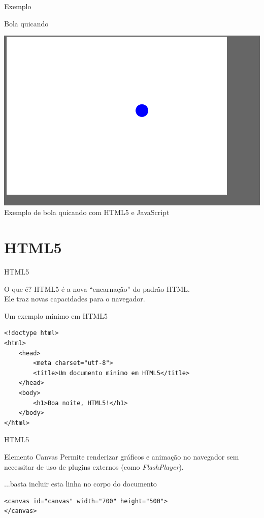 \documentclass[xcolor=dvipsnames,table]{beamer}
\begin{document}
	\begin{frame}{Exemplo}
		\begin{block}{Bola quicando}
			\begin{center}
	    		\includegraphics[height=.7\textheight]{images/bola-quicando.png}
	    		\\Exemplo de bola quicando com HTML5 e JavaScript
	  		\end{center}
		\end{block}
	\end{frame}
	
\section{HTML5}
\begin{frame}[fragile]{HTML5}
	\begin{block}{O que é?}
			HTML5 é a nova ``encarnação'' do padrão HTML. \\Ele traz novas capacidades para o navegador.
		\end{block} \pause
		\begin{block}{Um exemplo mínimo em HTML5}
			\begin{lstlisting}
<!doctype html>
<html>
	<head>
		<meta charset="utf-8">
		<title>Um documento minimo em HTML5</title>
	</head>
	<body>
		<h1>Boa noite, HTML5!</h1>
	</body>
</html>
\end{lstlisting}
		\end{block}
\end{frame}

\begin{frame}[fragile]{HTML5}
	\begin{block}{Elemento Canvas}
		Permite renderizar gráficos e animação no navegador sem necessitar de uso de plugins externos (como {\it FlashPlayer}).
	\end{block} \pause
		\begin{block}{...basta incluir esta linha no corpo do documento}
			\begin{lstlisting}
<canvas id="canvas" width="700" height="500">
</canvas>
\end{lstlisting}
		\end{block}
\end{frame}
\end{document}
